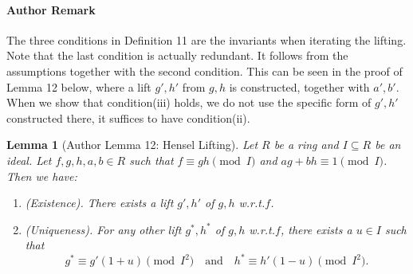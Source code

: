 \documentclass[10pt,a4paper]{article}
\newtheorem{ntlemma}[nttheorem]{Lemma}
\begin{document}
\paragraph{Author Remark}
The three conditions in Definition 11 are the invariants when iterating the lifting.
Note that the last condition is actually redundant. It follows from the assumptions together with the second condition. This can be seen in the proof of Lemma 12 below, where a lift $g',h'$ from $g,h$ is constructed, together with $a',b'$. When we show that condition(iii) holds, we do not use the specific form of $g',h'$ constructed there, it suffices to have condition(ii).
\begin{ntlemma}[Author Lemma 12: Hensel Lifting]
Let $R$ be a ring and $I\subseteq R$ be an ideal. Let $f,g,h,a,b\in R$ such that $f\equiv gh\pmod I$ and $ag+bh\equiv1\pmod I$. Then we have:
\begin{enumerate}
\item (Existence). There exists a lift $g',h'$ of $g,h$ w.r.t.$f$.
\item (Uniqueness). For any other lift $g^*,h^*$ of $g,h$ w.r.t.$f$, there exists a $u\in I$ such that
\[g^*\equiv g'(1+u)\pmod{I^2}\quad\text{and}\quad h^*\equiv h'(1-u)\pmod{I^2}.\]
\end{enumerate}
\end{ntlemma}
\end{document}
